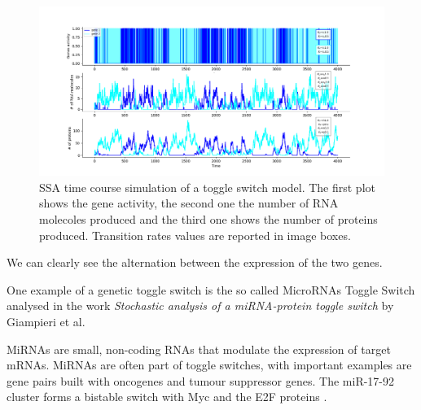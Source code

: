 \documentclass[12pt,a4paper]{report}
\begin{document}
\begin{figure}[!ht]
\hspace*{-2.5cm} 
\includegraphics[scale=0.59]{toggleswitchtimeplot.png}
\caption{SSA time course simulation of a toggle switch model. The first plot shows the gene activity, the second one the number of RNA molecoles produced and the third one shows the number of proteins produced. Transition rates values are reported in image boxes.}
\label{toggleswitchtimeplot}
\end{figure}
\newpage
We can clearly see the alternation between the expression of the two genes.

One example of a genetic toggle switch is the so called MicroRNAs Toggle Switch analysed in the work \emph{
Stochastic analysis of a miRNA-protein toggle switch} \cite{microRNAs} by Giampieri et al.  

MiRNAs are small, non-coding RNAs
that modulate the expression of target mRNAs. MiRNAs are often part of toggle switches, with important examples
are gene pairs built with oncogenes and tumour suppressor genes. The miR-17-92
cluster forms a bistable switch with Myc and the E2F proteins \cite{microRNAs}.





\end{document}
